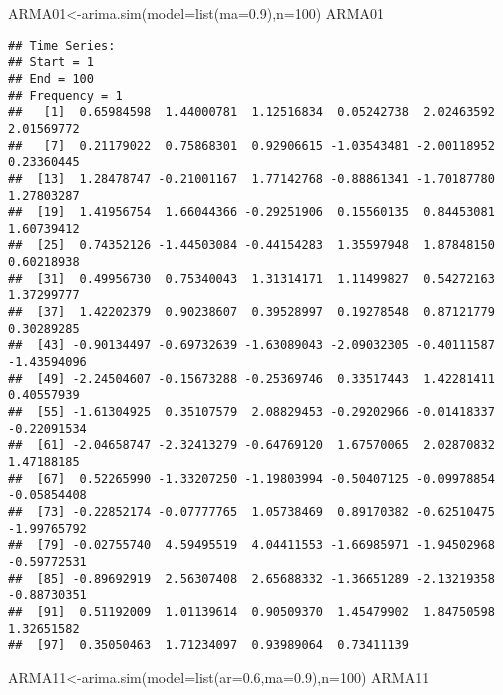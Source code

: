 \documentclass[
]{article}
\newenvironment{Shaded}{\begin{snugshade}}{\end{snugshade}}
\newcommand{\AttributeTok}[1]{\textcolor[rgb]{0.77,0.63,0.00}{#1}}
\newcommand{\DecValTok}[1]{\textcolor[rgb]{0.00,0.00,0.81}{#1}}
\newcommand{\FloatTok}[1]{\textcolor[rgb]{0.00,0.00,0.81}{#1}}
\newcommand{\FunctionTok}[1]{\textcolor[rgb]{0.00,0.00,0.00}{#1}}
\newcommand{\NormalTok}[1]{#1}
\newcommand{\OtherTok}[1]{\textcolor[rgb]{0.56,0.35,0.01}{#1}}
\begin{document}
\begin{Shaded}
\begin{Highlighting}[]
\NormalTok{ARMA01}\OtherTok{\textless{}{-}}\FunctionTok{arima.sim}\NormalTok{(}\AttributeTok{model=}\FunctionTok{list}\NormalTok{(}\AttributeTok{ma=}\FloatTok{0.9}\NormalTok{),}\AttributeTok{n=}\DecValTok{100}\NormalTok{)}
\NormalTok{ARMA01}
\end{Highlighting}
\end{Shaded}

\begin{verbatim}
## Time Series:
## Start = 1 
## End = 100 
## Frequency = 1 
##   [1]  0.65984598  1.44000781  1.12516834  0.05242738  2.02463592  2.01569772
##   [7]  0.21179022  0.75868301  0.92906615 -1.03543481 -2.00118952  0.23360445
##  [13]  1.28478747 -0.21001167  1.77142768 -0.88861341 -1.70187780  1.27803287
##  [19]  1.41956754  1.66044366 -0.29251906  0.15560135  0.84453081  1.60739412
##  [25]  0.74352126 -1.44503084 -0.44154283  1.35597948  1.87848150  0.60218938
##  [31]  0.49956730  0.75340043  1.31314171  1.11499827  0.54272163  1.37299777
##  [37]  1.42202379  0.90238607  0.39528997  0.19278548  0.87121779  0.30289285
##  [43] -0.90134497 -0.69732639 -1.63089043 -2.09032305 -0.40111587 -1.43594096
##  [49] -2.24504607 -0.15673288 -0.25369746  0.33517443  1.42281411  0.40557939
##  [55] -1.61304925  0.35107579  2.08829453 -0.29202966 -0.01418337 -0.22091534
##  [61] -2.04658747 -2.32413279 -0.64769120  1.67570065  2.02870832  1.47188185
##  [67]  0.52265990 -1.33207250 -1.19803994 -0.50407125 -0.09978854 -0.05854408
##  [73] -0.22852174 -0.07777765  1.05738469  0.89170382 -0.62510475 -1.99765792
##  [79] -0.02755740  4.59495519  4.04411553 -1.66985971 -1.94502968 -0.59772531
##  [85] -0.89692919  2.56307408  2.65688332 -1.36651289 -2.13219358 -0.88730351
##  [91]  0.51192009  1.01139614  0.90509370  1.45479902  1.84750598  1.32651582
##  [97]  0.35050463  1.71234097  0.93989064  0.73411139
\end{verbatim}

\begin{Shaded}
\begin{Highlighting}[]
\NormalTok{ARMA11}\OtherTok{\textless{}{-}}\FunctionTok{arima.sim}\NormalTok{(}\AttributeTok{model=}\FunctionTok{list}\NormalTok{(}\AttributeTok{ar=}\FloatTok{0.6}\NormalTok{,}\AttributeTok{ma=}\FloatTok{0.9}\NormalTok{),}\AttributeTok{n=}\DecValTok{100}\NormalTok{)}
\NormalTok{ARMA11}
\end{Highlighting}
\end{Shaded}
\end{document}
